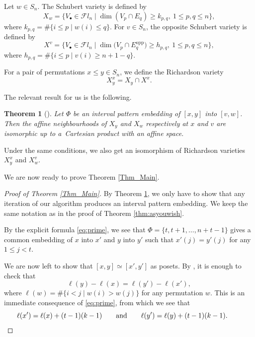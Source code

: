 \documentclass[10pt,a4paper]{amsart}
\numberwithin{equation}{section}
\newtheorem{Theorem}{Theorem}[section]
\begin{document}
Let $w\in S_n$. The Schubert variety is defined by
\begin{equation}\label{Eqn_SchubertVar}
X_w= \big\{V_\bullet\in\mathcal{F}l_n\mid
\dim(V_p\cap E_q)\geq k_{p,q}, \ 1\leq p,q\leq n \big\},
\end{equation}
where $k_{p,q}=\#\{i\leq p\mid w(i)\leq q\}$.
For $v\in S_n$, the opposite Schubert variety is defined by
\begin{equation*}%
X^v= \big\{V_\bullet\in\mathcal{F}l_n\mid
\dim\big(V_p\cap E^{\textrm{opp}}_q\big)\geq h_{p,q}, \ 1\leq p,q\leq n \big\},
\end{equation*}
where $h_{p,q}=\#\{i\leq p\mid v(i)\geq n+1-q\}$.

For a pair of permutations $x\leq y\in S_n$, we define the Richardson variety
\[
 X^x_y=X_y\cap X^x.
\]

The relevant result for us is the following.

\begin{Theorem}[{\cite[Theorem 4.2]{wooyong}}]\label{Thm_WY} Let $\Phi$ be an interval pattern embedding of $[x,y]$ into $[v,w]$. Then the affine neighbourhoods of $X_y$ and $X_w$ respectively at $x$ and $v$ are isomorphic up to a~Cartesian product with an affine space.
\end{Theorem}

\begin{Remark}
Under the same conditions, we also get an isomorphism of Richardson varieties $X_y^x$ and $X_w^v$.
\end{Remark}

We are now ready to prove Theorem \ref{Thm_Main}.

\begin{proof}[Proof of Theorem \ref{Thm_Main}] By Theorem \ref{Thm_WY}, we only have to show that any iteration of our algorithm produces an interval pattern embedding. We keep the same notation as in the proof of Theorem \ref{thm:asyouwish}.

 By the explicit formula \eqref{eq:prime}, we see that $\Phi=\{t, t+1, \dots, n+t-1\}$ gives a common embedding of $x$ into $x'$ and $y$ into $y'$ such that $x'(j)=y'(j)$ for any $1\leq j<t$.

We are now left to show that $[x,y]\simeq [x',y']$ as posets. By \cite[Lemma 2.1]{wooyong}, it is enough to check that
\[
\ell(y)-\ell(x)=\ell(y')-\ell(x'),
\]
where $\ell(w)=\#\{i<j\mid w(i)>w(j)\}$ for any permutation $w$. This is an immediate consequence of \eqref{eq:prime}, from which we see that
\[\ell(x')=\ell(x)+(t-1)(k-1) \qquad\hbox{and}\qquad\ell(y')=\ell(y)+(t-1)(k-1).\tag*{\qed}\]\renewcommand{\qed}{}
\end{proof}
\end{document}
